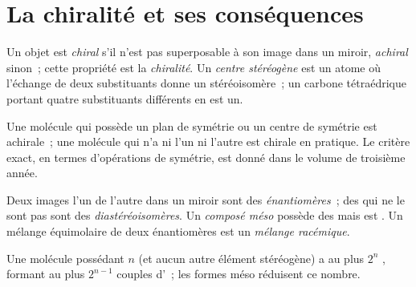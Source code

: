 \section{La chiralité et ses conséquences}

\begin{definition}\label{def:b1:stereochemistry-in-depth:stereocentre}
Un objet est \emph{chiral} s'il n'est pas superposable à
son image dans un miroir, \emph{achiral} sinon~; cette
propriété est la \emph{chiralité}. Un \emph{centre
stéréogène} est un atome où l'échange de deux
substituants donne un stéréoisomère~; un carbone tétraédrique portant
quatre substituants différents en est un.
\end{definition}

Une molécule qui possède un plan de symétrie ou un centre de symétrie est
achirale~; une molécule qui n'a ni l'un ni l'autre est chirale en
pratique. Le critère exact, en termes d'opérations de symétrie, est donné
dans le volume de troisième année.

\begin{definition}\label{def:b1:stereochemistry-in-depth:enantiomers}
Deux  images l'un de l'autre dans un miroir sont des
\emph{énantiomères}~; des  qui ne le sont pas sont
des \emph{diastéréoisomères}. Un \emph{composé
méso} possède des  mais est . Un
mélange équimolaire de deux énantiomères est un \emph{mélange
racémique}.
\end{definition}

\begin{proposition}\label{prop:b1:stereochemistry-in-depth:max-stereoisomers}
Une molécule possédant $n$  (et aucun autre élément
stéréogène) a au plus $2^n$ , formant au plus $2^{n-1}$
couples d'~; les formes méso réduisent ce nombre.
\end{proposition}

